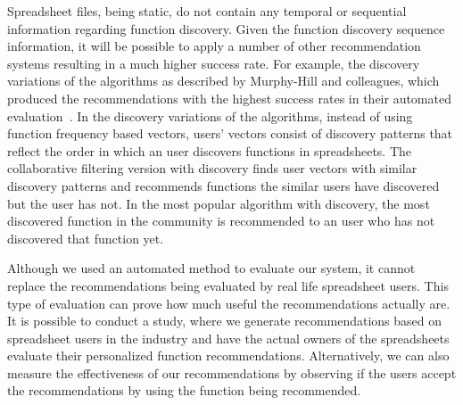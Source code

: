 \documentclass{article} %
\begin{document}
Spreadsheet files, being static, do not contain any temporal or sequential information regarding function discovery. Given the function discovery sequence information, it will be possible to apply a number of other recommendation systems resulting in a much higher success rate. For example, the discovery variations of the algorithms as described by Murphy-Hill and colleagues, which produced the recommendations with the highest success rates in their automated evaluation~\cite{murphy2012improving}. In the discovery variations of the algorithms, instead of using function frequency based vectors, users' vectors consist of discovery patterns that reflect the order in which an user discovers functions in spreadsheets. The collaborative filtering version with discovery finds user vectors with similar discovery patterns and recommends functions the similar users have discovered but the user has not. In the most popular algorithm with discovery, the most discovered function in the community is recommended to an user who has not discovered that function yet.

Although we used an automated method to evaluate our system, it cannot replace the recommendations being evaluated by real life spreadsheet users. This type of evaluation can prove how much useful the recommendations actually are. It is possible to conduct a study, where we generate recommendations based on spreadsheet users in the industry and have the actual owners of the spreadsheets evaluate their personalized function recommendations. Alternatively, we can also measure the effectiveness of our recommendations by observing if the users accept the recommendations by using the function being recommended.



\end{document}
